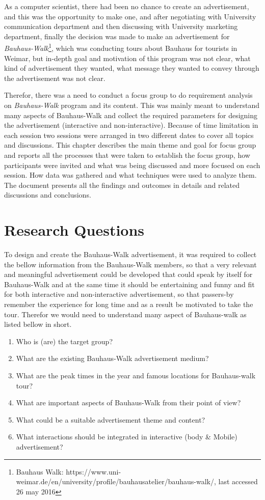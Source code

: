 As a computer scientist, there had been no chance to create an advertisement, and this was the opportunity to make one, and after negotiating with University communication department and then discussing with University marketing department, finally the decision was made to make an advertisement for \emph{Bauhaus-Walk}\footnote{Bauhaus Walk: https://www.uni-weimar.de/en/university/profile/bauhausatelier/bauhaus-walk/, last accessed 26 may 2016}, which was conducting tours about Bauhaus for tourists in Weimar, but in-depth goal and motivation of this program was not clear, what kind of advertisement they wanted, what message they wanted to convey through the advertisement was not clear.    

Therefor, there was a need to conduct a focus group to do requirement analysis on \emph{Bauhaus-Walk} program and its content. This was mainly meant to understand many aspects of Bauhaus-Walk and collect the required parameters for designing the advertisement (interactive and non-interactive). Because of time limitation in each session two sessions were arranged in two different dates to cover all topics and discussions. This chapter describes the main theme and goal for focus group and reports all the processes that were taken to establish the focus group, how participants were invited and what was being discussed and more focused on each session. How data was gathered and what techniques were used to analyze them. The document presents all the findings and outcomes in details and related discussions and conclusions.



\section{Research Questions}
To design and create the Bauhaus-Walk advertisement, it was required to collect the bellow information from the Bauhaus-Walk members, so that a very relevant and meaningful advertisement could be developed that could speak by itself for Bauhaus-Walk and at the same time it should be entertaining and funny and fit for both interactive and non-interactive advertisement, so that passers-by remember the experience for long time and as a result be motivated to take the tour. Therefor we would need to understand many aspect of Bauhaus-walk as listed bellow in short.

\begin{enumerate}
\item Who is (are) the target group?
\item What are the existing Bauhaus-Walk advertisement medium?
\item What are the peak times in the year and famous locations for Bauhaus-walk tour?
\item What are important aspects of Bauhaus-Walk from their point of view?
\item What could be a suitable advertisement theme and content?
\item What interactions should be integrated in interactive (body \& Mobile) advertisement?
\end{enumerate}


